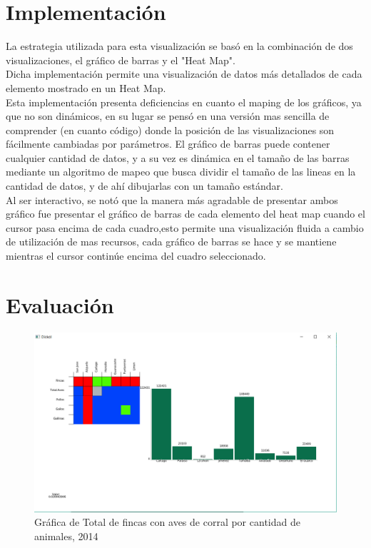 \documentclass{article}
\begin{document}
\section{Implementación}

La estrategia utilizada para esta visualización se basó en la combinación de dos visualizaciones, el gráfico de barras y el "Heat Map".\\
Dicha implementación permite una visualización de datos más detallados de cada elemento mostrado en un Heat Map.\\
Esta implementación presenta deficiencias en cuanto el maping de los gráficos, ya que no son dinámicos, en su lugar se pensó en una versión mas sencilla de comprender (en cuanto código) donde la posición de las visualizaciones son fácilmente cambiadas por parámetros.
\newpage
El gráfico de barras puede contener cualquier cantidad de datos, y a su vez es dinámica en el tamaño de las barras mediante un algoritmo de mapeo que busca dividir el tamaño de las lineas en la cantidad de datos, y de ahí dibujarlas con un tamaño estándar.\\
Al ser interactivo, se notó que la manera más agradable de presentar ambos gráfico fue presentar el gráfico de barras de cada elemento del heat map cuando el cursor pasa encima de cada cuadro,esto permite una visualización fluida a cambio de utilización de mas recursos, cada gráfico de barras se hace y se mantiene mientras el cursor continúe encima del cuadro seleccionado.\\

\newpage

\section{Evaluación}

\begin{figure}[h!]
\centering
\includegraphics[scale=0.4]{1.png}
\caption{Gráfica de Total de fincas con aves de corral por cantidad de animales, 2014}
\label{fig:Captura 2}
\end{figure}
\end{document}
